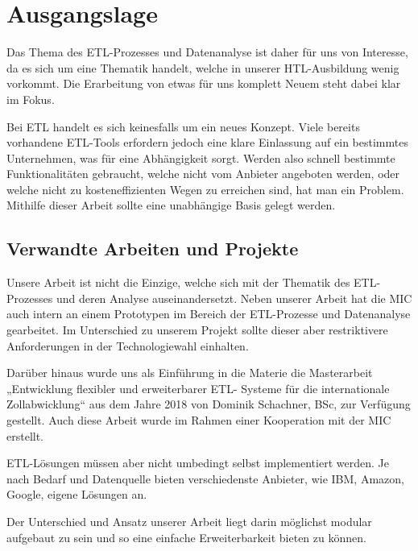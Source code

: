 \section{Ausgangslage}
Das Thema des ETL-Prozesses und Datenanalyse ist daher für uns von Interesse, da es sich um eine Thematik handelt, welche in unserer HTL-Ausbildung wenig vorkommt. Die Erarbeitung von etwas für uns komplett Neuem steht dabei klar im Fokus. 

Bei ETL handelt es sich keinesfalls um ein neues Konzept. Viele bereits vorhandene ETL-Tools erfordern jedoch eine klare Einlassung auf ein bestimmtes Unternehmen, was für eine Abhängigkeit sorgt. Werden also schnell bestimmte Funktionalitäten gebraucht, welche nicht vom Anbieter angeboten werden, oder welche nicht zu kosteneffizienten Wegen zu erreichen sind, hat man ein Problem. Mithilfe dieser Arbeit sollte eine unabhängige Basis gelegt werden. 

\subsection{Verwandte Arbeiten und Projekte}
Unsere Arbeit ist nicht die Einzige, welche sich mit der Thematik des ETL-Prozesses und deren Analyse auseinandersetzt. Neben unserer Arbeit hat die MIC auch intern an einem Prototypen im Bereich der ETL-Prozesse und Datenanalyse gearbeitet. Im Unterschied zu unserem Projekt sollte dieser aber restriktivere Anforderungen in der Technologiewahl einhalten. 
\vspace{5mm}\par
Darüber hinaus wurde uns als Einführung in die Materie die Masterarbeit „Entwicklung flexibler und erweiterbarer ETL- Systeme für die internationale Zollabwicklung“ aus dem Jahre 2018 von Dominik Schachner, BSc, zur Verfügung gestellt. Auch diese Arbeit wurde im Rahmen einer Kooperation mit der MIC erstellt.
\vspace{5mm}\par
ETL-Lösungen müssen aber nicht umbedingt selbst implementiert werden. Je nach Bedarf und Datenquelle bieten verschiedenste Anbieter, wie IBM, Amazon, Google, eigene Lösungen an.
\par
Der Unterschied und Ansatz unserer Arbeit liegt darin möglichst modular aufgebaut zu sein und so eine einfache Erweiterbarkeit bieten zu können.


\newpage
